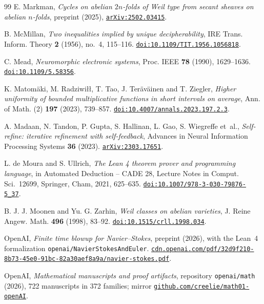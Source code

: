 \begin{thebibliography}{99}
E. Markman,
\emph{Cycles on abelian $2n$-folds of Weil type from secant sheaves on abelian $n$-folds},
preprint (2025), \href{https://arxiv.org/abs/2502.03415}{\nolinkurl{arXiv:2502.03415}}.

B. McMillan,
\emph{Two inequalities implied by unique decipherability},
IRE Trans. Inform. Theory \textbf{2} (1956), no.~4, 115--116.
\href{https://doi.org/10.1109/TIT.1956.1056818}{\nolinkurl{doi:10.1109/TIT.1956.1056818}}.

C. Mead,
\emph{Neuromorphic electronic systems},
Proc. IEEE \textbf{78} (1990), 1629--1636.
\href{https://doi.org/10.1109/5.58356}{\nolinkurl{doi:10.1109/5.58356}}.

K. Matom\"aki, M. Radziwi\l\l, T. Tao, J. Ter\"av\"ainen and T. Ziegler,
\emph{Higher uniformity of bounded multiplicative functions in short intervals on average},
Ann. of Math. (2) \textbf{197} (2023), 739--857.
\href{https://doi.org/10.4007/annals.2023.197.2.3}{\nolinkurl{doi:10.4007/annals.2023.197.2.3}}.

A. Madaan, N. Tandon, P. Gupta, S. Hallinan, L. Gao, S. Wiegreffe et~al.,
\emph{Self-refine: iterative refinement with self-feedback},
Advances in Neural Information Processing Systems \textbf{36} (2023).
\href{https://arxiv.org/abs/2303.17651}{\nolinkurl{arXiv:2303.17651}}.

L. de Moura and S. Ullrich,
\emph{The Lean 4 theorem prover and programming language},
in Automated Deduction -- CADE 28, Lecture Notes in Comput. Sci.~12699, Springer, Cham, 2021, 625--635.
\href{https://doi.org/10.1007/978-3-030-79876-5_37}{\nolinkurl{doi:10.1007/978-3-030-79876-5_37}}.

B. J. J. Moonen and Yu. G. Zarhin,
\emph{Weil classes on abelian varieties},
J. Reine Angew. Math. \textbf{496} (1998), 83--92.
\href{https://doi.org/10.1515/crll.1998.034}{\nolinkurl{doi:10.1515/crll.1998.034}}.

OpenAI,
\emph{Finite time blowup for Navier--Stokes},
preprint (2026), with the Lean~4 formalization \texttt{openai/NavierStokesAndEuler}.
\href{https://cdn.openai.com/pdf/32d9f210-8b73-45e0-91bc-82a30aef8a9a/navier-stokes.pdf}{\nolinkurl{cdn.openai.com/pdf/32d9f210-8b73-45e0-91bc-82a30aef8a9a/navier-stokes.pdf}}.

OpenAI,
\emph{Mathematical manuscripts and proof artifacts}, repository \texttt{openai/math} (2026), 722 manuscripts in 372 families;
mirror \href{https://github.com/creelie/math01-openAI}{\nolinkurl{github.com/creelie/math01-openAI}}.


\end{thebibliography}
